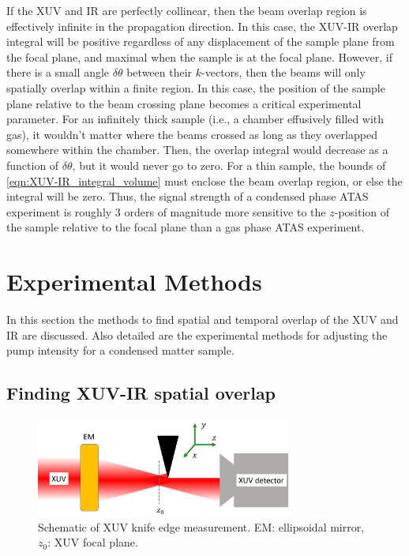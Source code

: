 If the XUV and IR are perfectly collinear, then the beam overlap region is effectively infinite in the propagation direction. In this case, the XUV-IR overlap integral will be positive regardless of any displacement of the sample plane from the focal plane, and maximal when the sample is at the focal plane. However, if there is a small angle $\delta \theta$ between their $k$-vectors, then the beams will only spatially overlap within a finite region. In this case, the position of the sample plane relative to the beam crossing plane becomes a critical experimental parameter. For an infinitely thick sample (i.e., a chamber effusively filled with gas), it wouldn't matter where the beams crossed as long as they overlapped somewhere within the chamber. Then, the overlap integral would decrease as a function of $\delta \theta$, but it would never go to zero. For a thin sample, the bounds of \cref{eqn:XUV-IR_integral_volume} must enclose the beam overlap region, or else the integral will be zero. Thus, the signal strength of a condensed phase ATAS experiment is roughly 3 orders of magnitude more sensitive to the $z$-position of the sample relative to the focal plane than a gas phase ATAS experiment.

\section{Experimental Methods}

In this section the methods to find spatial and temporal overlap of the XUV and IR are discussed. Also detailed are the experimental methods for adjusting the pump intensity for a condensed matter sample.

\subsection{Finding XUV-IR spatial overlap}
\begin{figure}
	\centering
	\includegraphics[width=0.75\textwidth]{figures/chap3/knife_edge_cartoon.png}
	\caption{Schematic of XUV knife edge measurement. EM: ellipsoidal mirror, $z_0$: XUV focal plane.}
	\label{fig:knife_edge_cartoon}
\end{figure}


